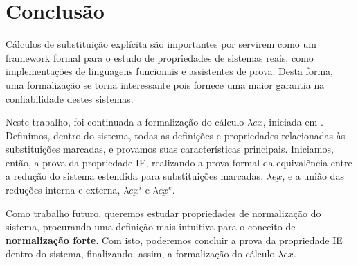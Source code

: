 \chapter{Conclusão}

Cálculos de substituição explícita são importantes por servirem como um
framework formal para o estudo de propriedades de sistemas reais, como
implementações de linguagens funcionais e assistentes de prova. Desta forma, uma
formalização se torna interessante pois fornece uma maior garantia na
confiabilidade destes sistemas.

Neste trabalho, foi continuada a formalização do cálculo $\lambda ex$,
iniciada em \cite{initial}. Definimos, dentro do sistema, todas as definições e
propriedades relacionadas às substituições marcadas, e provamos suas
características principais. Iniciamos, então, a prova da propriedade IE,
realizando a prova formal da equivalência entre a redução do sistema estendida
para substituições marcadas, $\lambda \underline{ex}$, e a união das reduções
interna e externa, $\lambda \underline{ex}^i$ e $\lambda \underline{ex}^e$.

Como trabalho futuro, queremos estudar propriedades de normalização do sistema,
procurando uma definição mais intuitiva para o conceito de \textbf{normalização
forte}. Com isto, poderemos concluir a prova da propriedade IE dentro do
sistema, finalizando, assim, a formalização do cálculo $\lambda ex$.

